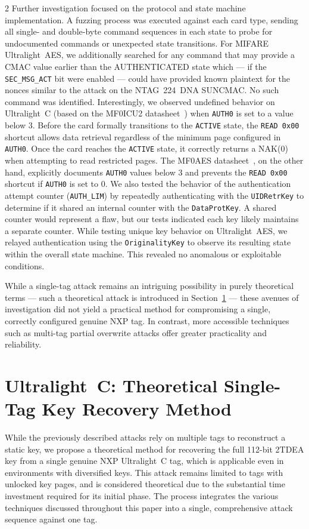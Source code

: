\documentclass[10pt,letterpaper]{article}
\begin{document}
\begin{multicols}{2}
Further investigation focused on the protocol and state machine implementation. A fuzzing process was executed against each card type, sending all single- and double-byte command sequences in each state to probe for undocumented commands or unexpected state transitions. For MIFARE Ultralight~AES, we additionally searched for any command that may provide a CMAC value earlier than the AUTHENTICATED state which --- if the \texttt{SEC\_MSG\_ACT} bit were enabled --- could have provided known plaintext for the nonces similar to the attack on the NTAG~224~DNA SUNCMAC. No such command was identified. Interestingly, we observed undefined behavior on Ultralight~C (based on the MF0ICU2 datasheet~\cite{mf0icu2_3r4_2024}) when \texttt{AUTH0} is set to a value below 3. Before the card formally transitions to the \texttt{ACTIVE} state, the \texttt{READ~0x00} shortcut allows data retrieval regardless of the minimum page configured in \texttt{AUTH0}. Once the card reaches the \texttt{ACTIVE} state, it correctly returns a NAK(0) when attempting to read restricted pages. The MF0AES datasheet~\cite{mf0aes_3r2_2023}, on the other hand, explicitly documents \texttt{AUTH0} values below 3 and prevents the \texttt{READ~0x00} shortcut if \texttt{AUTH0} is set to 0. We also tested the behavior of the authentication attempt counter (\texttt{AUTH\_LIM}) by repeatedly authenticating with the \texttt{UIDRetrKey} to determine if it shared an internal counter with the \texttt{DataProtKey}. A shared counter would represent a flaw, but our tests indicated each key likely maintains a separate counter. While testing unique key behavior on Ultralight~AES, we relayed authentication using the \texttt{OriginalityKey} to observe its resulting state within the overall state machine. This revealed no anomalous or exploitable conditions.

While a single-tag attack remains an intriguing possibility in purely theoretical terms --- such a theoretical attack is introduced in Section~\ref{sec:nxponecard} --- these avenues of investigation did not yield a practical method for compromising a single, correctly configured genuine NXP tag. In contrast, more accessible techniques such as multi-tag partial overwrite attacks offer greater practicality and reliability.

\section{Ultralight~C: Theoretical Single-Tag Key Recovery Method}
\label{sec:nxponecard}
While the previously described attacks rely on multiple tags to reconstruct a static key, we propose a theoretical method for recovering the full 112-bit 2TDEA key from a single genuine NXP Ultralight~C tag, which is applicable even in environments with diversified keys. This attack remains limited to tags with unlocked key pages, and is considered theoretical due to the substantial time investment required for its initial phase. The process integrates the various techniques discussed throughout this paper into a single, comprehensive attack sequence against one tag.


\end{multicols}
\end{document}

